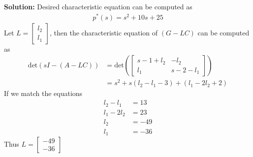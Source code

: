 \documentclass[twoside]{article}
\begin{document}
\textbf{Solution:} Desired characteristic equation can be computed as
%
\begin{align*}
  p^*(s) = s^2 + 10 s + 25
\end{align*}
%
Let $L = \left[ \begin{array}{c} l_2 \\ l_1 \end{array} \right]$, then
the characteristic equation of $(G - L C)$ can be computed as
%
\begin{align*}
  \mathrm{det} \left( s I - ( A - L C ) \right) &= 
  \mathrm{det} \left(
  \left[ \begin{array}{cc} s - 1 + l_2 & -l_2 \\ l_1 & s - 2 - l_1 \end{array} \right]
  \right)
\\
&= s^2 + s (l_2 - l_1 - 3) + (l_1 - 2 l_2 + 2)
\end{align*}
%
If we match the equations
%
\begin{align*}
  l_2 - l_1 &= 13
\\
  l_1 - 2 l_2 &= 23
\\
 l_2 &= -49
\\
 l_1 &= -36
\end{align*}
%
Thus $L = \left[ \begin{array}{c} -49 \\ -36 \end{array} \right]$




\end{document}
